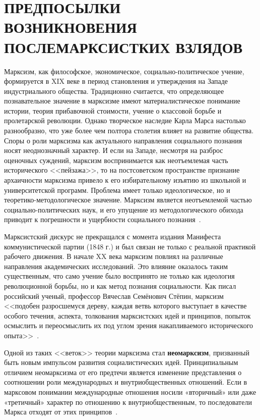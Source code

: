 \section[Предпосылки возникновения послемарксистских взглядов]
{ПРЕДПОСЫЛКИ ВОЗНИКНОВЕНИЯ \\ ПОСЛЕМАРКСИСТКИХ ВЗЛЯДОВ}

Марксизм, как философское, экономическое, социально-политическое учение,
формируется в XIX веке в период становления и утверждения на Западе
индустриального общества. Традиционно считается, что определяющее познавательное
значение в марксизме имеют материалистическое понимание истории, теория
прибавочной стоимости, учение о классовой борьбе и пролетарской революции.
Однако творческое наследие Карла Марса настолько разнообразно, что уже более
чем полтора столетия влияет на развитие общества. Споры о роли марксизма как
актуального направления социального познания носят неоднозначный характер.
И если на Западе, несмотря на разброс оценочных суждений, марксизм воспринимается
как неотъемлемая часть исторического <<пейзажа>>, то на постсоветском пространстве
признание архаичности марксизма привело к его избирательному изъятию из школьной
и университетской программ. Проблема имеет только идеологическое, но и
теоретико-методологическое значение. Марксизм является неотъемлемой частью
социально-политических наук, и его упущение из методологического обихода
приводит к погрешности и ущербности социального познания~\cite{article_neomarxism_today_and_tomorrow}.

Марксистский дискурс не прекращался с момента издания Манифеста коммунистической
партии (1848 г.) и был связан не только с реальной практикой рабочего движения.
В начале XX века марксизм повлиял на различные направления академических исследований.
Это влияние оказалось таким существенным, что само учение было воспринято не только
как идеология революционной борьбы, но и как метод познания социальности.
Как писал российский ученый, профессор Вячеслав Семёнович Стёпин, марксизм
<<подобен разросшемуся дереву, каждая ветвь которого выступает в качестве особого течения,
аспекта, толкования марксистских идей и принципов, попыток осмыслить и переосмыслить
их под углом зрения накапливаемого исторического опыта>>~\cite{era_of_change}.

Одной из таких <<веток>> теории марксизма стал \textbf{неомарксизм}, призванный быть
новым импульсом развития социалистических идей. Принципиальным отличием неомарксизма
от его предтечи является изменение представления о соотношении
роли международных и внутриобщественных отношений.
Если в марксовом понимании международные отношения носили «вторичный»
или даже «третичный» характер по отношению к внутриобщественным,
то последователи Маркса отходят от этих принципов~\cite{article_socialism}.

